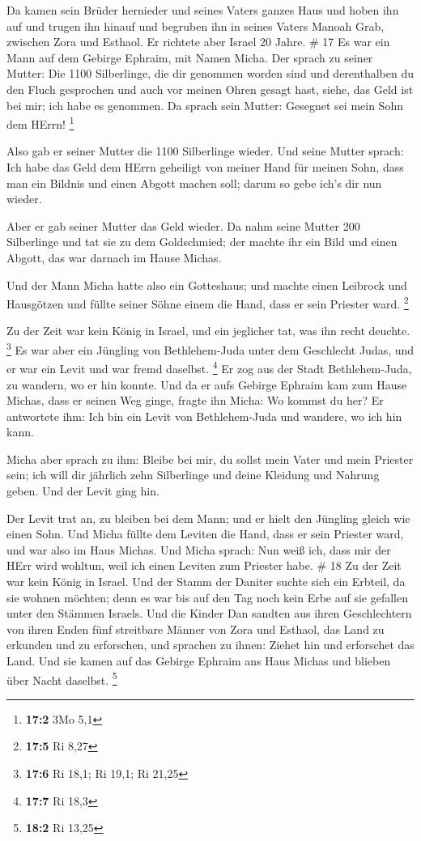 Da kamen sein Brüder hernieder und seines Vaters ganzes
Haus und hoben ihn auf und trugen ihn hinauf und begruben ihn in seines
Vaters Manoah Grab, zwischen Zora und Esthaol. Er richtete aber Israel
20 Jahre. \# 17  Es war ein Mann auf dem Gebirge Ephraim,
mit Namen Micha.  Der sprach zu seiner Mutter: Die 1100
Silberlinge, die dir genommen worden sind und derenthalben du den Fluch
gesprochen und auch vor meinen Ohren gesagt hast, siehe, das Geld ist
bei mir; ich habe es genommen. Da sprach sein Mutter: Gesegnet sei mein
Sohn dem HErrn! \footnote{\textbf{17:2} 3Mo 5,1}

 Also gab er seiner Mutter die 1100 Silberlinge wieder. Und
seine Mutter sprach: Ich habe das Geld dem HErrn geheiligt von meiner
Hand für meinen Sohn, dass man ein Bildnis und einen Abgott machen soll;
darum so gebe ich's dir nun wieder.

 Aber er gab seiner Mutter das Geld wieder. Da nahm seine
Mutter 200 Silberlinge und tat sie zu dem Goldschmied; der machte ihr
ein Bild und einen Abgott, das war darnach im Hause Michas.

 Und der Mann Micha hatte also ein Gotteshaus; und machte
einen Leibrock und Hausgötzen und füllte seiner Söhne einem die Hand,
dass er sein Priester ward. \footnote{\textbf{17:5} Ri 8,27}

 Zu der Zeit war kein König in Israel, und ein jeglicher
tat, was ihn recht deuchte. \footnote{\textbf{17:6} Ri 18,1; Ri 19,1; Ri
  21,25}  Es war aber ein Jüngling von Bethlehem-Juda unter
dem Geschlecht Judas, und er war ein Levit und war fremd daselbst.
\footnote{\textbf{17:7} Ri 18,3}  Er zog aus der Stadt
Bethlehem-Juda, zu wandern, wo er hin konnte. Und da er aufs Gebirge
Ephraim kam zum Hause Michas, dass er seinen Weg ginge, 
fragte ihn Micha: Wo kommst du her? Er antwortete ihm: Ich bin ein Levit
von Bethlehem-Juda und wandere, wo ich hin kann.

 Micha aber sprach zu ihm: Bleibe bei mir, du sollst mein
Vater und mein Priester sein; ich will dir jährlich zehn Silberlinge und
deine Kleidung und Nahrung geben. Und der Levit ging hin.

 Der Levit trat an, zu bleiben bei dem Mann; und er hielt
den Jüngling gleich wie einen Sohn.  Und Micha füllte dem
Leviten die Hand, dass er sein Priester ward, und war also im Haus
Michas.  Und Micha sprach: Nun weiß ich, dass mir der HErr
wird wohltun, weil ich einen Leviten zum Priester habe. \# 18
 Zu der Zeit war kein König in Israel. Und der Stamm der
Daniter suchte sich ein Erbteil, da sie wohnen möchten; denn es war bis
auf den Tag noch kein Erbe auf sie gefallen unter den Stämmen Israels.
 Und die Kinder Dan sandten aus ihren Geschlechtern von
ihren Enden fünf streitbare Männer von Zora und Esthaol, das Land zu
erkunden und zu erforschen, und sprachen zu ihnen: Ziehet hin und
erforschet das Land. Und sie kamen auf das Gebirge Ephraim ans Haus
Michas und blieben über Nacht daselbst. \footnote{\textbf{18:2} Ri 13,25}

